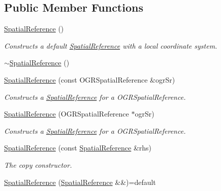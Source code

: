 \subsection*{Public Member Functions}
\begin{DoxyCompactItemize}
\item 
\hyperlink{group___imagery_module_ga00013f2d2c981a6c7182fb165818ef73}{Spatial\+Reference} ()
\begin{DoxyCompactList}\small\item\em Constructs a default \hyperlink{classdg_1_1deepcore_1_1geometry_1_1_spatial_reference}{Spatial\+Reference} with a local coordinate system. \end{DoxyCompactList}\item 
\hyperlink{classdg_1_1deepcore_1_1geometry_1_1_spatial_reference_a4559d0b1b1e92be9584c09e964aa9f9a}{$\sim$\+Spatial\+Reference} ()
\item 
\hyperlink{group___imagery_module_ga69e2cbc90f02865a0847647e59f64483}{Spatial\+Reference} (const O\+G\+R\+Spatial\+Reference \&ogr\+Sr)
\begin{DoxyCompactList}\small\item\em Constructs a \hyperlink{classdg_1_1deepcore_1_1geometry_1_1_spatial_reference}{Spatial\+Reference} for a O\+G\+R\+Spatial\+Reference. \end{DoxyCompactList}\item 
\hyperlink{group___imagery_module_gae24120971e90069c45802d2c6eca0472}{Spatial\+Reference} (O\+G\+R\+Spatial\+Reference $\ast$ogr\+Sr)
\begin{DoxyCompactList}\small\item\em Constructs a \hyperlink{classdg_1_1deepcore_1_1geometry_1_1_spatial_reference}{Spatial\+Reference} for a O\+G\+R\+Spatial\+Reference. \end{DoxyCompactList}\item 
\hyperlink{group___imagery_module_gae3c45a81c4b51c965c5bbf0b1d01e3b8}{Spatial\+Reference} (const \hyperlink{classdg_1_1deepcore_1_1geometry_1_1_spatial_reference}{Spatial\+Reference} \&rhs)
\begin{DoxyCompactList}\small\item\em The copy constructor. \end{DoxyCompactList}\item 
\hyperlink{classdg_1_1deepcore_1_1geometry_1_1_spatial_reference_a5e7a351aebdf1211fc3e73edd437285c}{Spatial\+Reference} (\hyperlink{classdg_1_1deepcore_1_1geometry_1_1_spatial_reference}{Spatial\+Reference} \&\&)=default
\item 

\end{DoxyCompactItemize}
